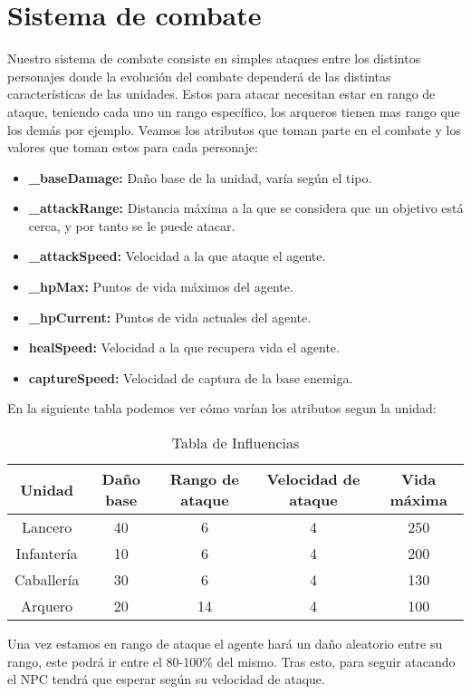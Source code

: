 \section{Sistema de combate}
Nuestro sistema de combate consiste en simples ataques entre los distintos personajes donde la evolución del combate dependerá de las distintas características de las unidades. Estos para atacar necesitan estar en rango de ataque, teniendo cada uno un rango específico, los arqueros tienen mas rango que los demás por ejemplo. Veamos los atributos que toman parte en el combate y los valores que toman estos para cada personaje:
\begin{itemize}
    \item \textbf{\_baseDamage:} Daño base de la unidad, varía según el tipo.
    \item \textbf{\_attackRange:} Distancia máxima a la que se considera que un objetivo está cerca, y por tanto se le puede atacar.
    \item \textbf{\_attackSpeed:} Velocidad a la que ataque el agente.
    \item \textbf{\_hpMax:} Puntos de vida máximos del agente.
    \item \textbf{\_hpCurrent:} Puntos de vida actuales del agente.
    \item \textbf{healSpeed:} Velocidad a la que recupera vida el agente.
    \item \textbf{captureSpeed:} Velocidad de captura de la base enemiga.
\end{itemize}
En la siguiente tabla podemos ver cómo varían los atributos segun la unidad:
\begin{table}[H]
    \centering
    \begin{tabular}{|c|c|c|c|c|}
       \hline        
       \textbf{Unidad} & Daño base & Rango de ataque & Velocidad de ataque & Vida máxima \\
        \hline
        Lancero & 40 & 6 & 4 & 250 \\
        \hline
        Infantería & 10 & 6 & 4 & 200 \\
        \hline
        Caballería & 30 & 6 & 4 & 130 \\
        \hline
        Arquero & 20 & 14 & 4 & 100 \\
        \hline
    \end{tabular}
    \caption{Tabla de Influencias}
\end{table}

Una vez estamos en rango de ataque el agente hará un daño aleatorio entre su rango, este podrá ir entre el 80-100\% del mismo. Tras esto, para seguir atacando el NPC tendrá que esperar según su velocidad de ataque.\\

